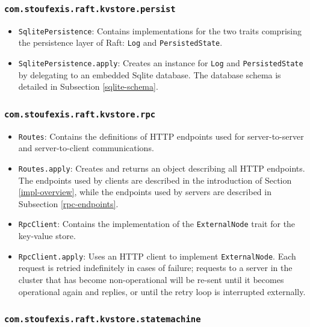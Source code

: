 \subsubsection{\lstinline|com.stoufexis.raft.kvstore.persist|}

\begin{itemize}
    \item \lstinline|SqlitePersistence|: Contains implementations for the two traits comprising the persistence layer of Raft: \lstinline|Log| and \lstinline|PersistedState|.
    \item \lstinline|SqlitePersistence.apply|: Creates an instance for \lstinline|Log| and \lstinline|PersistedState| by delegating to an embedded Sqlite database. The database schema is detailed in Subsection \ref{sqlite-schema}.
\end{itemize}

\subsubsection{\lstinline|com.stoufexis.raft.kvstore.rpc|}

\begin{itemize}
    \item \lstinline|Routes|: Contains the definitions of HTTP endpoints used for server-to-server and server-to-client communications.
    \item \lstinline|Routes.apply|: Creates and returns an object describing all HTTP endpoints. The endpoints used by clients are described in the introduction of Section \ref{impl-overview}, while the endpoints used by servers are described in Subsection \ref{rpc-endpoints}.
    \item \lstinline|RpcClient|: Contains the implementation of the \lstinline|ExternalNode| trait for the key-value store.
    \item \lstinline|RpcClient.apply|: Uses an HTTP client to implement \lstinline|ExternalNode|. Each request is retried indefinitely in cases of failure; requests to a server in the cluster that has become non-operational will be re-sent until it becomes operational again and replies, or until the retry loop is interrupted externally.
\end{itemize}

\subsubsection{\lstinline|com.stoufexis.raft.kvstore.statemachine|}

